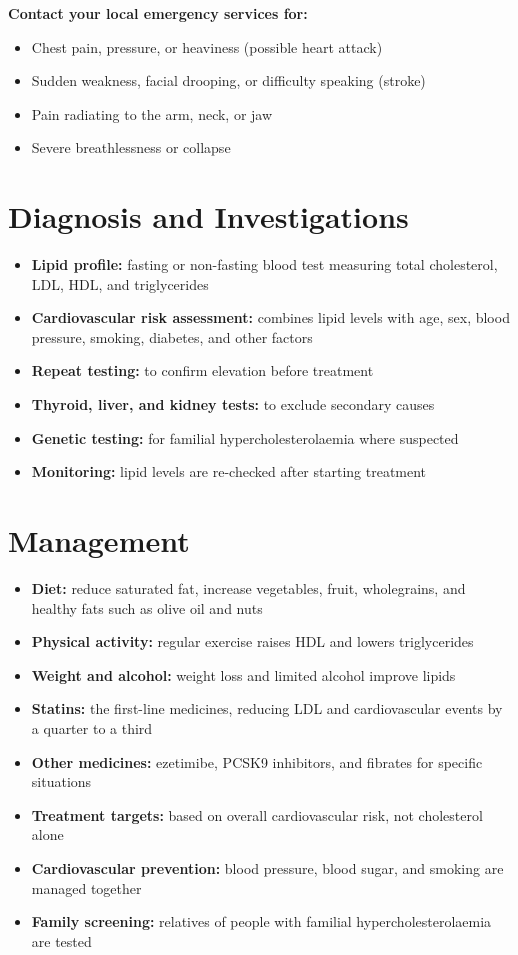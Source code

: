 \textbf{Contact your local emergency services for:}
\begin{itemize}
    \item Chest pain, pressure, or heaviness (possible heart attack)
    \item Sudden weakness, facial drooping, or difficulty speaking (stroke)
    \item Pain radiating to the arm, neck, or jaw
    \item Severe breathlessness or collapse
\end{itemize}

\section*{Diagnosis and Investigations}
\begin{itemize}
    \item \textbf{Lipid profile:} fasting or non-fasting blood test measuring total cholesterol, LDL, HDL, and triglycerides
    \item \textbf{Cardiovascular risk assessment:} combines lipid levels with age, sex, blood pressure, smoking, diabetes, and other factors
    \item \textbf{Repeat testing:} to confirm elevation before treatment
    \item \textbf{Thyroid, liver, and kidney tests:} to exclude secondary causes
    \item \textbf{Genetic testing:} for familial hypercholesterolaemia where suspected
    \item \textbf{Monitoring:} lipid levels are re-checked after starting treatment
\end{itemize}

\section*{Management}
\begin{itemize}
    \item \textbf{Diet:} reduce saturated fat, increase vegetables, fruit, wholegrains, and healthy fats such as olive oil and nuts
    \item \textbf{Physical activity:} regular exercise raises HDL and lowers triglycerides
    \item \textbf{Weight and alcohol:} weight loss and limited alcohol improve lipids
    \item \textbf{Statins:} the first-line medicines, reducing LDL and cardiovascular events by a quarter to a third
    \item \textbf{Other medicines:} ezetimibe, PCSK9 inhibitors, and fibrates for specific situations
    \item \textbf{Treatment targets:} based on overall cardiovascular risk, not cholesterol alone
    \item \textbf{Cardiovascular prevention:} blood pressure, blood sugar, and smoking are managed together
    \item \textbf{Family screening:} relatives of people with familial hypercholesterolaemia are tested
\end{itemize}

